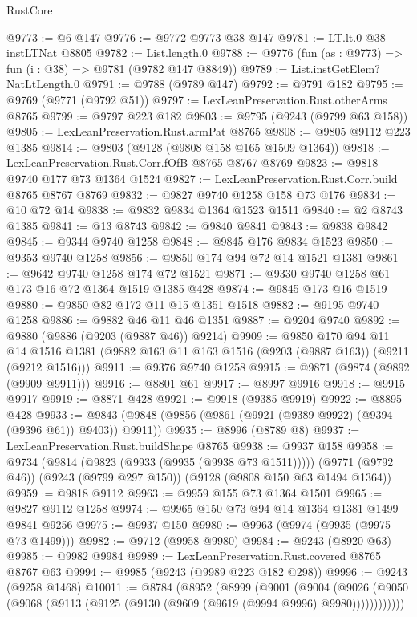\begin{lexlean}{RustCore}
\begin{coremodule}
@9773 := @6 @147
@9776 := @9772 @9773 @38 @147
@9781 := LT.lt.{0} @38 instLTNat @8805
@9782 := List.length.{0}
@9788 := @9776 (fun (as : @9773) => fun (i : @38) => @9781 (@9782 @147 @8849))
@9789 := List.instGetElem?NatLtLength.{0}
@9791 := @9788 (@9789 @147)
@9792 := @9791 @182
@9795 := @9769 (@9771 (@9792 @51))
@9797 := LexLeanPreservation.Rust.otherArms @8765
@9799 := @9797 @223 @182
@9803 := @9795 (@9243 (@9799 @63 @158))
@9805 := LexLeanPreservation.Rust.armPat @8765
@9808 := @9805 @9112 @223 @1385
@9814 := @9803 (@9128 (@9808 @158 @165 @1509 @1364))
@9818 := LexLeanPreservation.Rust.Corr.fOfB @8765 @8767 @8769
@9823 := @9818 @9740 @177 @73 @1364 @1524
@9827 := LexLeanPreservation.Rust.Corr.build @8765 @8767 @8769
@9832 := @9827 @9740 @1258 @158 @73 @176
@9834 := @10 @72 @14
@9838 := @9832 @9834 @1364 @1523 @1511
@9840 := @2 @8743 @1385
@9841 := @13 @8743
@9842 := @9840 @9841
@9843 := @9838 @9842
@9845 := @9344 @9740 @1258
@9848 := @9845 @176 @9834 @1523
@9850 := @9353 @9740 @1258
@9856 := @9850 @174 @94 @72 @14 @1521 @1381
@9861 := @9642 @9740 @1258 @174 @72 @1521
@9871 := @9330 @9740 @1258 @61 @173 @16 @72 @1364 @1519 @1385 @428
@9874 := @9845 @173 @16 @1519
@9880 := @9850 @82 @172 @11 @15 @1351 @1518
@9882 := @9195 @9740 @1258
@9886 := @9882 @46 @11 @46 @1351
@9887 := @9204 @9740
@9892 := @9880 (@9886 (@9203 (@9887 @46)) @9214)
@9909 := @9850
    @170
    @94
    @11
    @14
    @1516
    @1381
    (@9882 @163 @11 @163 @1516 (@9203 (@9887 @163)) (@9211 (@9212 @1516)))
@9911 := @9376 @9740 @1258
@9915 := @9871 (@9874 (@9892 (@9909 @9911)))
@9916 := @8801 @61
@9917 := @8997 @9916
@9918 := @9915 @9917
@9919 := @8871 @428
@9921 := @9918 (@9385 @9919)
@9922 := @8895 @428
@9933 := @9843 (@9848 (@9856 (@9861 (@9921 (@9389 @9922) (@9394 (@9396 @61)) @9403)) @9911))
@9935 := @8996 (@8789 @8)
@9937 := LexLeanPreservation.Rust.buildShape @8765
@9938 := @9937 @158
@9958 := @9734
    (@9814 (@9823 (@9933 (@9935 (@9938 @73 @1511)))))
    (@9771 (@9792 @46))
    (@9243 (@9799 @297 @150))
    (@9128 (@9808 @150 @63 @1494 @1364))
@9959 := @9818 @9112
@9963 := @9959 @155 @73 @1364 @1501
@9965 := @9827 @9112 @1258
@9974 := @9965 @150 @73 @94 @14 @1364 @1381 @1499 @9841 @9256
@9975 := @9937 @150
@9980 := @9963 (@9974 (@9935 (@9975 @73 @1499)))
@9982 := @9712 (@9958 @9980)
@9984 := @9243 (@8920 @63)
@9985 := @9982 @9984
@9989 := LexLeanPreservation.Rust.covered @8765 @8767 @63
@9994 := @9985 (@9243 (@9989 @223 @182 @298))
@9996 := @9243 (@9258 @1468)
@10011 := @8784
    (@8952
      (@8999
        (@9001
          (@9004
            (@9026 (@9050 (@9068 (@9113 (@9125 (@9130 (@9609 (@9619 (@9994 @9996) @9980))))))))))))

\end{coremodule}
\end{lexlean}
